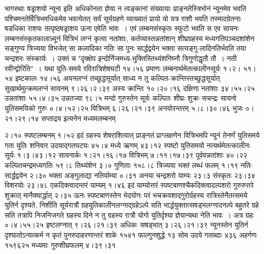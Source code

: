 \documentclass[11pt, openany]{book}
\begin{document}
\newpage

\begin{sloppypar}
\noindent भागस्थाः षड्राशयो न्यूना इति अधिकोनता ज्ञेया न त्वङ्कानां संख्यायाः प्राङ्नतेस्त्रिभोनं न्यूनमेव भवति पश्चिमनतेर्वित्रिभमधिकमेव भवत्येतत् सर्वं सूर्यग्रहणे व्याख्यातं प्रायो यो यत्र राशौ भवति तस्मादग्रेतनाः षडधिका राशयः तत्पृष्ठषड्राशय ऊना एवेति भावः~। एवं लम्बनसंस्कृतः स्फुटो भवति स एव सायनः लम्बनसंस्कृतकालान्न्यूनं वित्रिभं लग्नं कृत्वा नतांशाः, कर्तव्यास्तन्नतांशान् शीघ्रग्रहस्य मध्यगतिपञ्चदशांशेन सङ्गुण्य त्रिज्यया विभजेत् सा कलादिका नतिः सा पुनः सार्द्धद्वयेन भक्ता सत्यङ्गु-लादिनतिर्भवति तया चन्द्रशरः संस्कार्यः~। उक्तं च {\color{violet}"दृक्क्षेप इन्दोर्निजमध्य-भुक्तिस्तिथ्यंशनिघ्नौ त्रिगुणोद्धृतौ तौ~। नती रवीन्द्वोरि}ति"~। यथा युति-समये रविरात्रिशेषघटी १४।५६ प्रमाणः लम्बनार्थमेतत्कालीनसूर्यः १।२। ५१।५४ इष्टकालः १४।५६ अयनलग्नं तच्छुद्धसूर्यात् साध्य न तु कल्पित-क्रान्तिस्तच्छुद्धसूर्यात् सुखार्थमुत्क्रमलग्नं सायनम् ९।२६।२।३९ अस्य क्रान्तिः १०।२०।१६ दक्षिणा नतांशाः ३४।५५।२५ उन्नतांशाः ५५।४।३५ उन्नतज्या ९८।५ मन्दो गुरुस्तेन सूर्यः कल्पितः शीघ्रः शुक्रः सचन्द्रः सायनो युतिसमयिको गुरुः ०।४।५२।२५ वित्रिभम् ६।२६।२१।३९ अनयोरन्तरम् ५।८।३०।४६ भुजः ०।२१।२९।१४ सप्ताद्रय इत्यनेन मध्यमलम्बनम्
\end{sloppypar}

\newpage

\begin{sloppypar}
\noindent २।१० स्पष्टलम्बनम् १।५२ इदं ग्रहस्य शेषराशित्वात् प्राङ्नतं प्राग्लक्षणेन वित्रिभमपि न्यूनं तेनर्णं युतिसमये गता युतिः शनिवार उदयाद्गतघट्यः ४५।४ मध्ये ऋणम् ४३।१२ स्पष्टो युतिसमयो नत्यर्थमेतत्कालीनः सूर्यः १।३।४३।१२ सायनार्कः १।२१।१६।१७ वित्रिभम् ७।११।१७।३९ पूर्ववन्नतांशाः ४०।२२ कल्पितचन्द्रमध्यगतिः ५९।८ तिथ्यंशेन ३।० गुणिताः १५८।८ त्रिज्यया भक्तं लब्धं फलम् १।१९ नतिः सार्द्धद्वयेन २।३० भक्ता अङ्गुलाद्या नतिर्याम्या ०।३१ अनया चन्द्रशरो याम्यः २३।३ संस्कृतः २३।३४ विशरयोः २३।४८ एकदिक्त्वादन्तरं याम्यम् १।४६ इदं याम्योत्तरं स्पष्टबाणश्चैकदिक्त्वादल्पशरो गुरुरुत्तरे शुक्रात् मानैक्यार्द्धात् २।३५ ऊनः स्पष्टबाणस्तेन भेदयोगः परं भचक्रवशाद्गुरोर्ग्रहस्य रात्रिस्तेनैतत्समये युतिर्न दृश्यते, निशीति सूर्यरात्रौ ग्रहयुतिकालीनलग्नाद्ग्रहेऽल्पे सति भार्द्धयुक्तात्सषड्भलग्नादनल्पे बहुतरे ग्रहे सति तत्रापि निजनिजगते ग्रहस्य दिने न तु ग्रहस्य रात्रौ योगो युतिर्दृश्या ज्ञेयान्यथा नेति भावः~। अत्र ग्रहः ०।४।५५।२५ इष्टलग्नात् ९।२६।२१।३९ अधिकः सषड्भात् ३।२६।२१।३९ न्यूनस्तेन युतिर्न दृश्यातोऽन्यत्कर्म न कृतं पुनरुदाहरणान्तरं शाके १५४१ फाल्गुनशुद्धे १३ सोम उदये गताब्दाः ४३६ अहर्गणः १५९६२५ मध्यमाः गुरुशीघ्रफलम् ४।३९।३१
\end{sloppypar}
\end{document}
